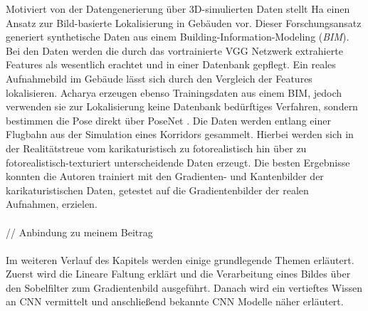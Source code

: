 Motiviert von der Datengenerierung über 3D-simulierten Daten stellt Ha \etal\cite{haImagebasedIndoorLocalization2018} einen Ansatz zur Bild-basierte Lokalisierung in Gebäuden vor. Dieser Forschungsansatz generiert synthetische Daten aus einem Building-Information-Modeling (\textit{BIM}). Bei den Daten werden die durch das vortrainierte VGG Netzwerk \cite{simonyanVeryDeepConvolutional2014} extrahierte Features als wesentlich erachtet und in einer Datenbank gepflegt. Ein reales Aufnahmebild im Gebäude lässt sich durch den Vergleich der Features lokalisieren. Acharya \etal\cite{acharyaBIMPoseNetIndoorCamera2019, acharyaMODELLINGUNCERTAINTYSINGLE2019} erzeugen ebenso Trainingsdaten aus einem BIM, jedoch verwenden sie zur Lokalisierung keine Datenbank bedürftiges Verfahren, sondern bestimmen die Pose direkt über PoseNet \cite{kendallPoseNetConvolutionalNetwork2015}. Die Daten werden entlang einer Flugbahn aus der Simulation eines Korridors gesammelt. Hierbei werden sich in der Realitätstreue vom karikaturistisch zu fotorealistisch hin über zu fotorealistisch-texturiert unterscheidende Daten erzeugt. Die besten Ergebnisse konnten die Autoren trainiert mit den Gradienten- und Kantenbilder der karikaturistischen Daten, getestet auf die Gradientenbilder der realen Aufnahmen, erzielen.
\\\\// Anbindung zu meinem Beitrag
\\\\
Im weiteren Verlauf des Kapitels werden einige grundlegende Themen erläutert. Zuerst wird die Lineare Faltung erklärt und die Verarbeitung eines Bildes über den Sobelfilter zum Gradientenbild ausgeführt. Danach wird ein vertieftes Wissen an CNN vermittelt und anschließend bekannte CNN Modelle näher erläutert.



